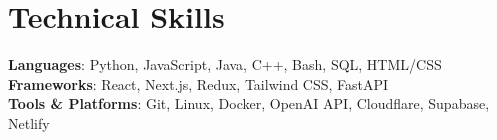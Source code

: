 \documentclass[letterpaper,11pt]{article}
\begin{document}
\section{Technical Skills}
\begin{itemize}[leftmargin=0.15in, label={}]
  \small{\item{
        \textbf{Languages}{: Python, JavaScript, Java, C++, Bash, SQL, HTML/CSS
        } \\
        \textbf{Frameworks}{: React, Next.js, Redux, Tailwind CSS, FastAPI} \\
        \textbf{Tools \& Platforms}{: Git, Linux, Docker, OpenAI API, Cloudflare, Supabase, Netlify} \\
        }}
\end{itemize}

\end{document}
